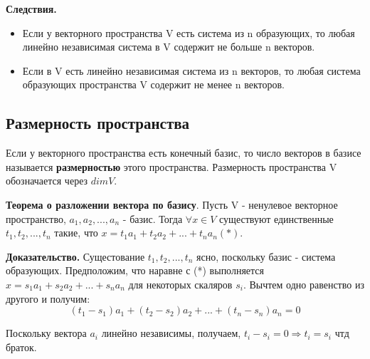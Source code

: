 \documentclass[a4paper]{article}
\begin{document}
    \begin{htheorem}
        \textbf{Следствия.}
        \begin{itemize}
            \item Если у векторного пространства V есть система из n образующих, то любая линейно независимая система в V содержит не больше n векторов.
            \item  Если в V есть линейно независимая система из n векторов, то любая система образующих пространства V содержит не менее n векторов.
        \end{itemize}
    \end{htheorem}




    \subsection*{Размерность пространства}
    Если у векторного пространства есть конечный базис, то число векторов в базисе называется \textbf{размерностью} этого пространства.
    Размерность пространства V обозначается через $dim V$.

    \begin{htheorem}
        \textbf{Теорема о разложении вектора по базису}. Пусть V - ненулевое векторное пространство, $a_1, a_2, ..., a_n$ - базис. Тогда $\forall x \in V$ существуют единственные $t_1, t_2, ..., t_n$ такие, что $x = t_1a_1 + t_2a_2 + ... + t_na_n (*)$.
    \end{htheorem}


    \begin{hproof}
        \textbf{Доказательство.} Сущестование $t_1, t_2, ..., t_n$ ясно, поскольку базис - система образующих. Предположим, что наравне с (*) выполняется $x = s_1a_1 + s_2a_2 + ... + s_na_n$ для некоторых скаляров $s_i$. Вычтем одно равенство из другого и получим: \begin{equation}
        (t_1-s_1)
                                                                                                                                                                                                                                                                             a_1 + (t_2-s_2)a_2 + ... + (t_n-s_n)a_n = 0
        \end{equation}

        Поскольку вектора $a_i$ линейно независимы, получаем, $t_i-s_i = 0 \Rightarrow t_i = s_i$ чтд браток.
    \end{hproof}
\end{document}
